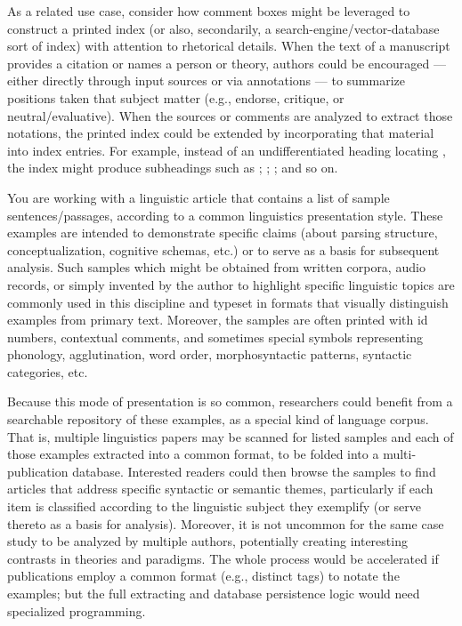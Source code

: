 \documentclass[11pt, twocolumn]{article}
\begin{document}
{\begin{docDescription}
\pseudoIndent{} As a related use case, consider how comment boxes
might be leveraged to construct a printed index (or also, secondarily,
a search-engine/vector-database sort of index) with attention to
rhetorical details. When the text of a manuscript provides a
citation or names a person or theory, authors could be
encouraged --- either directly through input sources or via 
annotations --- to summarize positions taken \visavis{}
that subject matter (e.g., endorse, critique, or neutral/evaluative).
When the sources or comments are analyzed to extract those
notations, the printed index could be extended by
incorporating that material into index entries. For example,
instead of an undifferentiated heading locating ,
the index might produce subheadings such as
; ;
;
 and so on.

 You are working with a
linguistic article that contains a list of sample sentences/passages,
according to a common linguistics presentation style. These
examples are intended to demonstrate specific claims (about
parsing structure, conceptualization, cognitive schemas, etc.) or to serve
as a basis for subsequent analysis. Such samples \mdash{} which
might be obtained from written corpora, audio records, or simply
invented by the author to highlight specific linguistic topics
\mdash{} are commonly used in this discipline and typeset in
formats that visually distinguish examples from primary
text. Moreover, the samples are often printed with id numbers,
contextual comments, and sometimes special symbols representing
phonology, agglutination, word order, morphosyntactic patterns, syntactic categories, etc.

\pseudoIndent{} Because this mode of presentation is so common,
researchers could benefit from a searchable repository of these examples,
as a special kind of language corpus. That is, multiple linguistics
papers may be scanned for listed samples and each of those
examples extracted into a common format, to be folded into a
multi-publication database. Interested readers could then
browse the samples to find articles that address specific
syntactic or semantic themes, particularly if each item
is classified according to the linguistic subject they
exemplify (or serve thereto as a basis for analysis). Moreover, it is not uncommon
for the same case study
to be analyzed by multiple authors, potentially creating
interesting contrasts in theories and paradigms.
The whole process would be accelerated if publications employ a
common format (e.g., distinct  tags) to notate the examples;
but the full extracting and database persistence logic
would need specialized programming.


\end{docDescription}}
\end{document}
